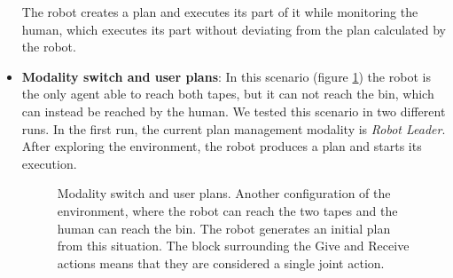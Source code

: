 \begin{itemize}
The robot creates a plan and executes its part of it while monitoring the human,
which executes its part without deviating from the plan calculated by
the robot.

\item
\textbf{Modality switch and user plans}:
In this scenario (figure \ref{fig:case_study-helper_scenario2}) the robot is the only agent able to reach both tapes, but it can not reach
the bin, which can instead be reached by the human. We tested
this scenario in two different runs. In the first run, the current plan management modality is \textit{Robot Leader}.
After exploring the environment, the robot produces a plan and starts its execution.

\begin{figure}
  \centering
  \caption[Robot helper experiment2 ]{Modality switch and user plans. Another configuration of
    the environment, where the robot can reach the two tapes and the
    human can reach the bin. The robot generates an initial plan
  from this situation. The block surrounding the Give and Receive
  actions means that they are considered a single joint action.}
  \centering
  \label{fig:case_study-helper_scenario2}
\end{figure}


\end{itemize}
